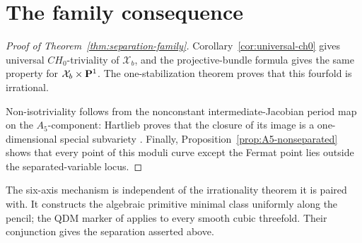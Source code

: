 \section{The family consequence}
\label{sec:family-consequence}

\begin{proof}[Proof of Theorem~\ref{thm:separation-family}]
Corollary~\ref{cor:universal-ch0} gives universal \(CH_0\)-triviality of
\(\mathcal X_b\), and the projective-bundle formula gives the same property
for \(\mathcal X_b\times\mathbf P^1\).  The one-stabilization theorem
\cite[Theorem~1.1]{RuddM1} proves that this fourfold is irrational.

Non-isotriviality follows from the nonconstant intermediate-Jacobian period
map on the \(A_5\)-component: Hartlieb proves that the closure of its image is
a one-dimensional special subvariety
\cite[Proposition~5.7]{Hartlieb}.  Finally,
Proposition~\ref{prop:A5-nonseparated} shows that every point of this moduli
curve except the Fermat point lies outside the separated-variable locus.
%
%
%
\end{proof}

The six-axis mechanism is independent of the irrationality theorem it is
paired with.  It constructs the algebraic primitive minimal class uniformly
along the pencil; the QDM marker of \cite{RuddM1} applies to every smooth
cubic threefold.  Their conjunction gives the separation asserted above.
